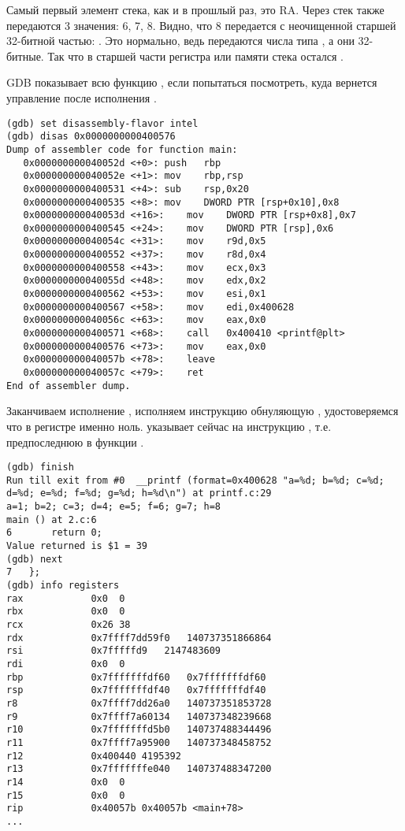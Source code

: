 Самый первый элемент стека, как и в прошлый раз, это \ac{RA}.
Через стек также передаются 3 значения: 6, 7, 8.
Видно, что 8 передается с неочищенной старшей 32-битной частью: .
Это нормально, ведь передаются числа типа \Tint, а они 32-битные.
Так что в старшей части регистра или памяти стека остался .

\ac{GDB} показывает всю функцию \main, если попытаться посмотреть, куда вернется управление после исполнения \printf{}.

\begin{lstlisting}
(gdb) set disassembly-flavor intel
(gdb) disas 0x0000000000400576
Dump of assembler code for function main:
   0x000000000040052d <+0>:	push   rbp
   0x000000000040052e <+1>:	mov    rbp,rsp
   0x0000000000400531 <+4>:	sub    rsp,0x20
   0x0000000000400535 <+8>:	mov    DWORD PTR [rsp+0x10],0x8
   0x000000000040053d <+16>:	mov    DWORD PTR [rsp+0x8],0x7
   0x0000000000400545 <+24>:	mov    DWORD PTR [rsp],0x6
   0x000000000040054c <+31>:	mov    r9d,0x5
   0x0000000000400552 <+37>:	mov    r8d,0x4
   0x0000000000400558 <+43>:	mov    ecx,0x3
   0x000000000040055d <+48>:	mov    edx,0x2
   0x0000000000400562 <+53>:	mov    esi,0x1
   0x0000000000400567 <+58>:	mov    edi,0x400628
   0x000000000040056c <+63>:	mov    eax,0x0
   0x0000000000400571 <+68>:	call   0x400410 <printf@plt>
   0x0000000000400576 <+73>:	mov    eax,0x0
   0x000000000040057b <+78>:	leave  
   0x000000000040057c <+79>:	ret    
End of assembler dump.
\end{lstlisting}

Заканчиваем исполнение \printf, исполняем инструкцию обнуляющую \EAX, удостоверяемся что в регистре \EAX именно ноль.
\RIP указывает сейчас на инструкцию , т.е. предпоследнюю в функции \main{}.

\begin{lstlisting}
(gdb) finish
Run till exit from #0  __printf (format=0x400628 "a=%d; b=%d; c=%d; d=%d; e=%d; f=%d; g=%d; h=%d\n") at printf.c:29
a=1; b=2; c=3; d=4; e=5; f=6; g=7; h=8
main () at 2.c:6
6		return 0;
Value returned is $1 = 39
(gdb) next
7	};
(gdb) info registers
rax            0x0	0
rbx            0x0	0
rcx            0x26	38
rdx            0x7ffff7dd59f0	140737351866864
rsi            0x7fffffd9	2147483609
rdi            0x0	0
rbp            0x7fffffffdf60	0x7fffffffdf60
rsp            0x7fffffffdf40	0x7fffffffdf40
r8             0x7ffff7dd26a0	140737351853728
r9             0x7ffff7a60134	140737348239668
r10            0x7fffffffd5b0	140737488344496
r11            0x7ffff7a95900	140737348458752
r12            0x400440	4195392
r13            0x7fffffffe040	140737488347200
r14            0x0	0
r15            0x0	0
rip            0x40057b	0x40057b <main+78>
...
\end{lstlisting}
